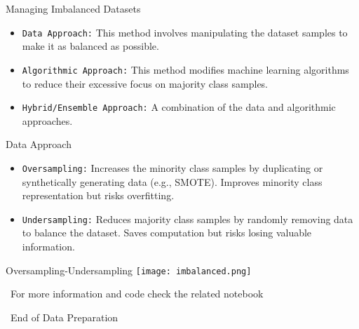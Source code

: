\documentclass[serif, aspectratio=169]{beamer}
\begin{document}
\begin{frame}{Managing Imbalanced Datasets}
    \begin{itemize}
        \item \texttt{\color{red}Data Approach:} This method involves manipulating the dataset samples to make it as balanced as possible.

        \item \texttt{\color{red}Algorithmic Approach:} This method modifies machine learning algorithms to reduce their excessive focus on majority class samples.

        \item \texttt{\color{red}Hybrid/Ensemble Approach:} A combination of the data and algorithmic approaches. 
    \end{itemize}
\end{frame}

\begin{frame}{Data Approach}
    \begin{itemize}
        \item \texttt{\color{red}Oversampling:} Increases the minority class samples by duplicating or synthetically generating data (e.g., SMOTE). Improves minority class representation but risks overfitting.
        \item \texttt{\color{red}Undersampling:} Reduces majority class samples by randomly removing data to balance the dataset. Saves computation but risks losing valuable information.
    \end{itemize}
\end{frame}

\begin{frame}{Oversampling-Undersampling}
    \centering
    \texttt{[image: imbalanced.png]}
\end{frame}

\begin{frame}
    \begin{center}
        {\Huge\ \color{red}For more information and code check the related notebook}
    \end{center}
\end{frame}


\begin{frame}
    \begin{center}
        {\Huge\ End of Data Preparation}
    \end{center}
\end{frame}
\end{document}
